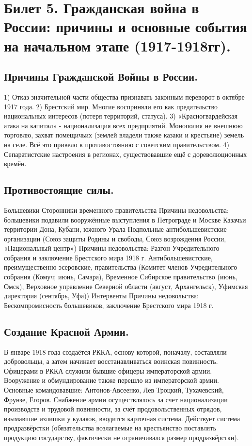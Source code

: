 \section{Билет 5. Гражданская война в России: причины и основные события на начальном этапе (1917-1918гг).}

\subsection{Причины Гражданской Войны в России.}

    1) Отказ значительной части общества признавать законным переворот в октябре 1917 года.
    2) Брестский мир. Многие восприняли его как предательство национальных интересов (потеря территорий, статуса).
    3) «Красногвардейская атака на капитал» - национализация всех предприятий. Монополия не внешнюю торговлю, захват помещичьих (землей владели также казаки и крестьяне) земель на селе. Всё это привело к противостоянию с советским правительством.
    4) Сепаратистские настроения в регионах, существовавшие ещё с дореволюционных времён.

\subsection{Противостоящие силы.}

Большевики	Сторонники временного правительства
			Причины недовольства: большевики подавили вооружённые выступления в Петрограде и Москве
		Казачьи территории Дона, Кубани, южного Урала
		Подпольные антибольшевистские организации (Союз защиты Родины и свободы, Союз возрождения России, «Национальный центр»)
			Причины недовольства: Разгон Учредительного собрания и заключение Брестского мира 1918 г.
		Антибольшевистские, преимущественно эсеровские, правительства (Комитет членов Учредительного собрания (Комуч; июнь, Самара), Временное Сибирское правительство (июнь, Омск), Верховное управление Северной области (август, Архангельск), Уфимская директория (сентябрь, Уфа))
		Интервенты
			Причины недовольства: Бескомпромисность большевиков, заключение Брестского мира 1918 г.

\subsection{Создание Красной Армии.}

В январе 1918 года создаётся РККА, основу которой, поначалу, составляли добровольцы, а затем начинает восстанавливаться воинская повинность. Офицерами в РККА служили бывшие офицеры императорской армии. Вооружение и обмундирование также перешло из императорской армии. 
Основные командовавшие: Антонов-Авсеенко, Лев Троцкий, Тухачевский, Фрунзе, Егоров.
Снабжение армии осуществлялось за счет национализации производств и трудовой повинности, за счёт продовольственных отрядов, изымавшие излишки у кулаков, вводится карточная система. Действует система продразвёрстки (обязательства возлагаемые на крестьянство поставлять продукцию государству, фактически не ограничивался размер продразвёрстки).

